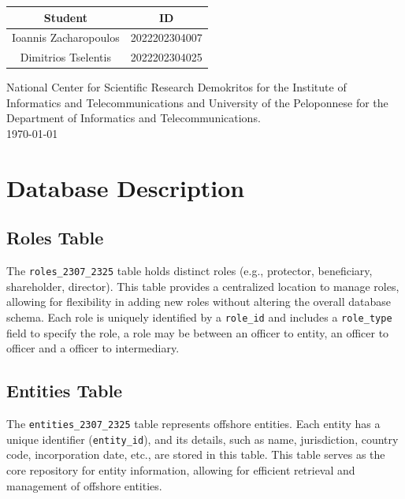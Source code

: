 \documentclass{article}
\begin{document}
\begin{titlepage}
\begin{center}
        \vspace{1cm}
        \renewcommand{\arraystretch}{1.5}
        \begin{tabular}{|c|c|}
            \hline
            \textbf{Student}              & \textbf{ID}           \\
            \hline
            \large{Ioannis Zacharopoulos} & \large{2022202304007} \\
            \hline
            \large{Dimitrios Tselentis}   & \large{2022202304025} \\
            \hline
        \end{tabular}

        \vspace{2cm}
        \Large
        \textmd{National Center for Scientific Research Demokritos for the Institute of Informatics and Telecommunications and University of the Peloponnese for the Department of Informatics and Telecommunications.} \\[0.81cm]

        \today \\

    \end{center}
\end{titlepage}

\newpage

\section*{\centering Database Description}


\subsection*{Roles Table}
The \texttt{roles\_2307\_2325} table holds distinct roles (e.g., protector, beneficiary, shareholder, director). This table provides a centralized location to manage roles, allowing for flexibility in adding new roles without altering the overall database schema. Each role is uniquely identified by a \texttt{role\_id} and includes a \texttt{role\_type} field to specify the role, a role may be between an officer to entity, an officer to officer and a officer to intermediary.

\subsection*{Entities Table}
The \texttt{entities\_2307\_2325} table represents offshore entities. Each entity has a unique identifier (\texttt{entity\_id}), and its details, such as name, jurisdiction, country code, incorporation date, etc., are stored in this table. This table serves as the core repository for entity information, allowing for efficient retrieval and management of offshore entities.
\end{document}
